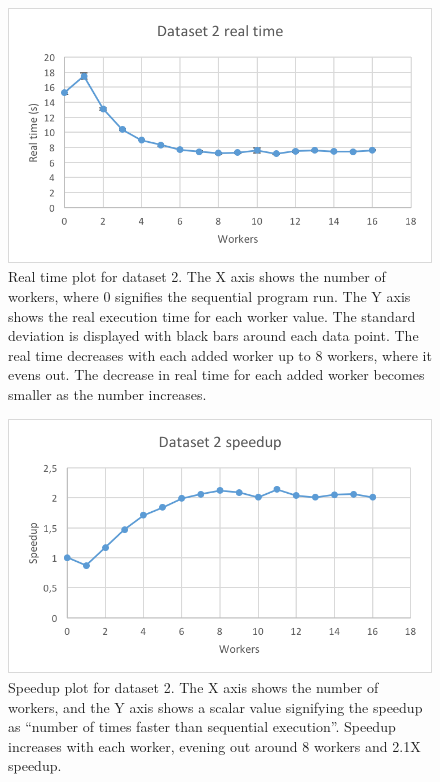 \begin{figure}[ht]
  \centering
  \includegraphics[width=120mm]{figures/dataset_2/dataset_2_real_time.png}
  \caption[Real time plot for dataset 2.]{Real time plot for dataset 2. The X axis shows the number of workers, where 0 signifies the sequential program run.
  The Y axis shows the real execution time for each worker value. The standard deviation is displayed with black bars around each data point. The real time
  decreases with each added worker up to 8 workers, where it evens out. The decrease in real time for each added worker becomes smaller as the number increases.}
  \label{fig:dataset_2_real_time}
\end{figure}

\begin{figure}[ht]
  \centering
  \includegraphics[width=120mm]{figures/dataset_2/dataset_2_speedup.png}
  \caption[Speedup plot for dataset 2.]{Speedup plot for dataset 2. The X axis shows the number of workers, and the Y axis shows a scalar value signifying the speedup as
  ``number of times faster than sequential execution''. Speedup increases with each worker, evening out around 8 workers and 2.1X speedup.}
  \label{fig:dataset_2_speedup}
\end{figure}

